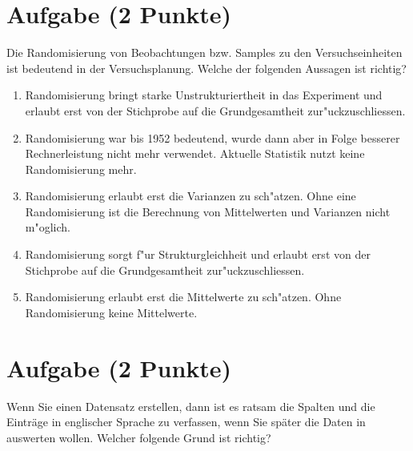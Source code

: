 \documentclass[a4paper, 10pt]{scrartcl}\usepackage[]{graphicx}\usepackage[]{xcolor}
\begin{document}
\section{Aufgabe \hfill (2 Punkte)}

Die Randomisierung von Beobachtungen bzw. Samples zu den Versuchseinheiten
ist bedeutend in der Versuchsplanung. Welche der folgenden Aussagen ist richtig?



\begin{enumerate}
\item [\textbf{A} \msquare] Randomisierung bringt starke Unstrukturiertheit in das Experiment und erlaubt erst von der Stichprobe auf die Grundgesamtheit zur{"u}ckzuschliessen.
\item [\textbf{B} \msquare] Randomisierung war bis 1952 bedeutend, wurde dann aber in Folge besserer Rechnerleistung nicht mehr verwendet. Aktuelle Statistik nutzt keine Randomisierung mehr.
\item [\textbf{C} \msquare] Randomisierung erlaubt erst die Varianzen zu sch{"a}tzen. Ohne eine Randomisierung ist die Berechnung von Mittelwerten und Varianzen nicht m{"o}glich.
\item [\textbf{D} \msquare] Randomisierung sorgt f{"u}r Strukturgleichheit und erlaubt erst von der Stichprobe auf die Grundgesamtheit zur{"u}ckzuschliessen.
\item [\textbf{E} \msquare] Randomisierung erlaubt erst die Mittelwerte zu sch{"a}tzen. Ohne Randomisierung keine Mittelwerte.
\end{enumerate}

\section{Aufgabe \hfill (2 Punkte)}

Wenn Sie einen Datensatz erstellen, dann ist es ratsam die Spalten und die
Eintr{\"a}ge in englischer Sprache zu verfassen, wenn Sie sp{\"a}ter die Daten in
\Rlogo auswerten wollen. Welcher folgende Grund ist richtig?
\end{document}
